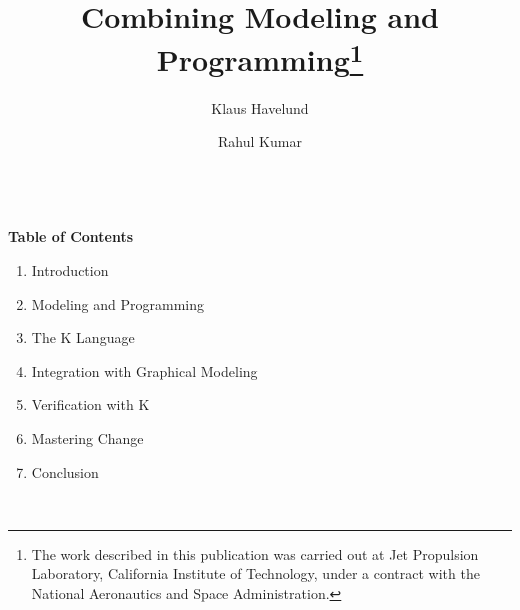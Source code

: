 \documentclass{llncs}
\title{Combining Modeling and Programming\thanks{The work
  described in this publication was carried out at Jet Propulsion
  Laboratory, California Institute of Technology, under a contract with
  the National Aeronautics and Space Administration.}}
\author{Klaus Havelund \and Rahul Kumar}
\institute{
  Jet Propulsion Laboratory\\
  California Institute of Technology\\
  California, USA
}
\begin{document}
\maketitle




\vspace{1cm}
\color{red}
\noindent\makebox[\linewidth]{\rule{\paperwidth}{0.4pt}}\\

{\bf Table of Contents}

\begin{enumerate}
  \item Introduction
  \item Modeling and Programming
  \item The K Language
  \item Integration with Graphical Modeling
  \item Verification with K
  \item Mastering Change
  \item Conclusion
\end{enumerate}

\noindent\makebox[\linewidth]{\rule{\paperwidth}{0.4pt}}\\
\color{black}
\vspace{1cm}








\end{document}
